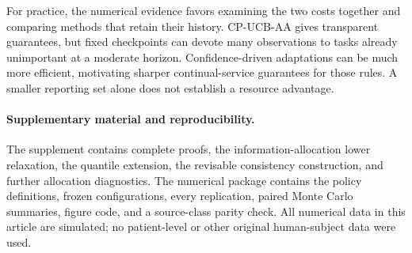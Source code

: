 \documentclass[11pt]{article}
\begin{document}
For practice, the numerical evidence favors examining the two costs together
and comparing methods that retain their history. CP-UCB-AA gives transparent
guarantees, but fixed checkpoints can devote many observations to tasks already
unimportant at a moderate horizon. Confidence-driven adaptations can be much
more efficient, motivating sharper continual-service guarantees for those
rules. A smaller reporting set alone does not establish a resource advantage.

\paragraph{Supplementary material and reproducibility.}
The supplement contains complete proofs, the information-allocation lower
relaxation, the quantile extension, the revisable consistency construction,
and further allocation diagnostics. The numerical package contains the policy
definitions, frozen configurations, every replication, paired Monte Carlo
summaries, figure code, and a source-class parity check. All numerical data in
this article are simulated; no patient-level or other original human-subject
data were used.


\end{document}
